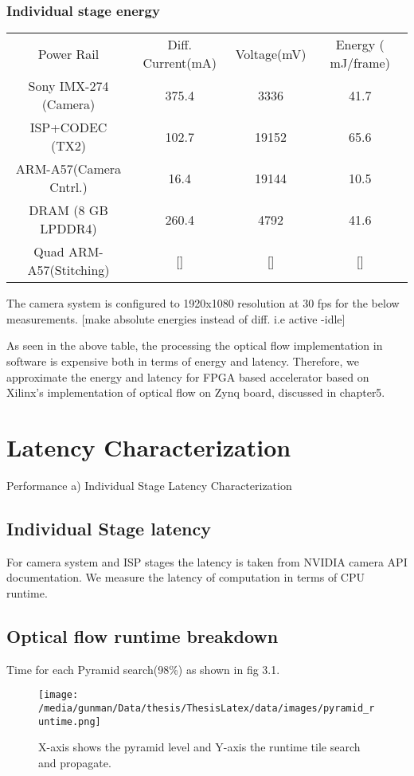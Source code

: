 \subsubsection{Individual stage energy}
	\begin{tabular}{c|c|c|c}
	Power Rail & Diff. Current(mA) & Voltage(mV) & Energy ( mJ/frame) \\
	Sony IMX-274 (Camera) & 375.4 & 3336 & 41.7 \\
	ISP+CODEC (TX2) & 102.7 & 19152 & 65.6 \\
	ARM-A57(Camera Cntrl.) & 16.4 & 19144 & 10.5 \\
	DRAM (8 GB LPDDR4)  & 260.4 & 4792 & 41.6 \\
	Quad ARM-A57(Stitching) & [] & [] & [] \\
	\end{tabular} \newline \newline
	The camera system is configured to 1920x1080 resolution at 30 fps for the below measurements. [make absolute energies instead of diff. i.e active -idle]\newline
	
	As seen in the above table, the processing  the optical flow implementation in software is expensive both in terms of energy and latency. Therefore, we approximate the energy and latency for FPGA based accelerator based on Xilinx's implementation of optical flow on Zynq board, discussed in chapter5.\newline

	
\section{Latency Characterization}

 Performance \newline
	a) Individual Stage Latency Characterization
	

\subsection{Individual Stage latency}
For camera system and ISP stages the latency is taken from NVIDIA camera API documentation. We measure the latency of computation in terms of CPU runtime. 

\subsection{Optical flow runtime breakdown}
Time for each Pyramid search(98\%) as shown in fig 3.1.
\begin{figure}[h]
	\begin{center}
		\texttt{[image: /media/gunman/Data/thesis/ThesisLatex/data/images/pyramid\_runtime.png]}
		\caption{X-axis shows the pyramid level and Y-axis the runtime tile search and propagate.}
		\label{fig:ex_4_9}
	\end{center}
	\vspace{-0.3in}
\end{figure} 


